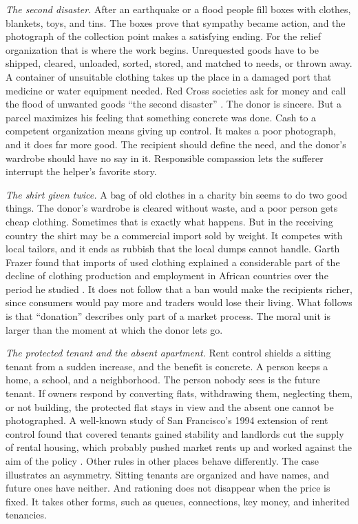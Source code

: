 \documentclass[12pt,a4paper]{book}
\begin{document}
\emph{The second disaster.} After an earthquake or a flood people fill boxes with clothes, blankets, toys, and tins. The boxes prove that sympathy became action, and the photograph of the collection point makes a satisfying ending. For the relief organization that is where the work begins. Unrequested goods have to be shipped, cleared, unloaded, sorted, stored, and matched to needs, or thrown away. A container of unsuitable clothing takes up the place in a damaged port that medicine or water equipment needed. Red Cross societies ask for money and call the flood of unwanted goods ``the second disaster'' \cite{NZRedCrossSecondDisaster2026}. The donor is sincere. But a parcel maximizes his feeling that something concrete was done. Cash to a competent organization means giving up control. It makes a poor photograph, and it does far more good. The recipient should define the need, and the donor's wardrobe should have no say in it. Responsible compassion lets the sufferer interrupt the helper's favorite story.

\emph{The shirt given twice.} A bag of old clothes in a charity bin seems to do two good things. The donor's wardrobe is cleared without waste, and a poor person gets cheap clothing. Sometimes that is exactly what happens. But in the receiving country the shirt may be a commercial import sold by weight. It competes with local tailors, and it ends as rubbish that the local dumps cannot handle. Garth Frazer found that imports of used clothing explained a considerable part of the decline of clothing production and employment in African countries over the period he studied \cite{Frazer2008}. It does not follow that a ban would make the recipients richer, since consumers would pay more and traders would lose their living. What follows is that ``donation'' describes only part of a market process. The moral unit is larger than the moment at which the donor lets go.

\emph{The protected tenant and the absent apartment.} Rent control shields a sitting tenant from a sudden increase, and the benefit is concrete. A person keeps a home, a school, and a neighborhood. The person nobody sees is the future tenant. If owners respond by converting flats, withdrawing them, neglecting them, or not building, the protected flat stays in view and the absent one cannot be photographed. A well-known study of San Francisco's 1994 extension of rent control found that covered tenants gained stability and landlords cut the supply of rental housing, which probably pushed market rents up and worked against the aim of the policy \cite{DiamondMcQuadeQian2019}. Other rules in other places behave differently. The case illustrates an asymmetry. Sitting tenants are organized and have names, and future ones have neither. And rationing does not disappear when the price is fixed. It takes other forms, such as queues, connections, key money, and inherited tenancies.
\end{document}
